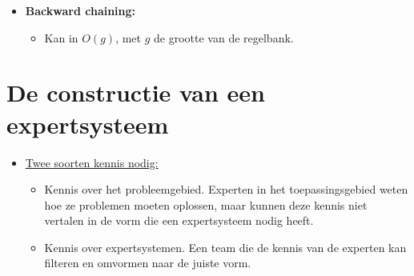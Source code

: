 \begin{itemize}
\begin{itemize}
\begin{itemize}
			\item Forward Chaining werkt van links naar rechts, startend vanaf de gekende feiten om tot een conclusie te komen.
			\alert In het algoritme kunnen regels toegepast worden die uiteindelijk niet bijdragen tot de oplossing. Men probeert dit efficiënter op te lossen met backwards chaining.
		\end{itemize}
		\item \textbf{Backward chaining:}
		\begin{itemize}
			\item Kan in $O(g)$, met $g$ de grootte van de regelbank.
		\end{itemize}
	\end{itemize}
\end{itemize}
\section{De constructie van een expertsysteem}
\begin{itemize}
	\item \underline{Twee soorten kennis nodig:}
	\begin{itemize}
		\item Kennis over het probleemgebied. Experten in het toepassingsgebied weten hoe ze problemen moeten oplossen, maar kunnen deze kennis niet vertalen in de vorm die een expertsysteem nodig heeft.
		\item Kennis over expertsystemen. Een team die de kennis van de experten kan filteren en omvormen naar de juiste vorm. 
	\end{itemize}
\end{itemize}
